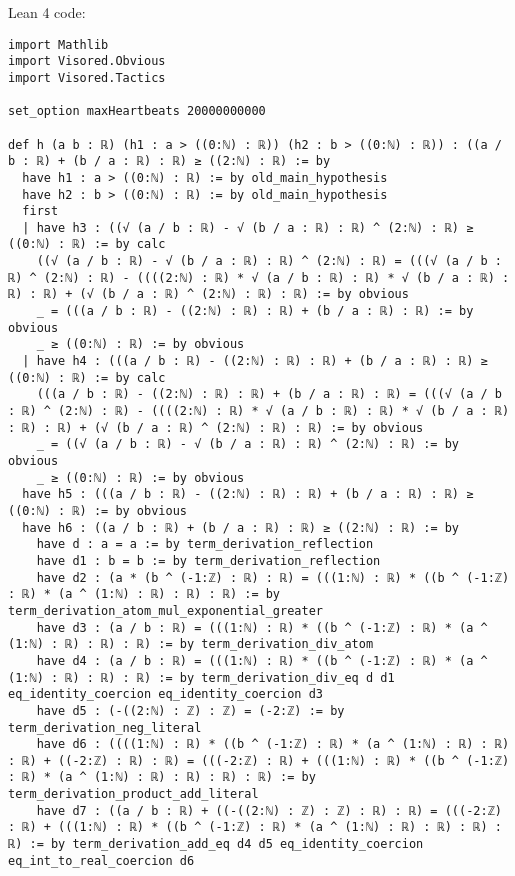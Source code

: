 \documentclass{article}
\begin{document}
Lean 4 code:
\begin{tcolorbox}[colback=white!10, width=\linewidth]
\begin{lstlisting}[language=Lean4]
import Mathlib
import Visored.Obvious
import Visored.Tactics

set_option maxHeartbeats 20000000000

def h (a b : ℝ) (h1 : a > ((0:ℕ) : ℝ)) (h2 : b > ((0:ℕ) : ℝ)) : ((a / b : ℝ) + (b / a : ℝ) : ℝ) ≥ ((2:ℕ) : ℝ) := by
  have h1 : a > ((0:ℕ) : ℝ) := by old_main_hypothesis
  have h2 : b > ((0:ℕ) : ℝ) := by old_main_hypothesis
  first
  | have h3 : ((√ (a / b : ℝ) - √ (b / a : ℝ) : ℝ) ^ (2:ℕ) : ℝ) ≥ ((0:ℕ) : ℝ) := by calc
    ((√ (a / b : ℝ) - √ (b / a : ℝ) : ℝ) ^ (2:ℕ) : ℝ) = (((√ (a / b : ℝ) ^ (2:ℕ) : ℝ) - ((((2:ℕ) : ℝ) * √ (a / b : ℝ) : ℝ) * √ (b / a : ℝ) : ℝ) : ℝ) + (√ (b / a : ℝ) ^ (2:ℕ) : ℝ) : ℝ) := by obvious
    _ = (((a / b : ℝ) - ((2:ℕ) : ℝ) : ℝ) + (b / a : ℝ) : ℝ) := by obvious
    _ ≥ ((0:ℕ) : ℝ) := by obvious
  | have h4 : (((a / b : ℝ) - ((2:ℕ) : ℝ) : ℝ) + (b / a : ℝ) : ℝ) ≥ ((0:ℕ) : ℝ) := by calc
    (((a / b : ℝ) - ((2:ℕ) : ℝ) : ℝ) + (b / a : ℝ) : ℝ) = (((√ (a / b : ℝ) ^ (2:ℕ) : ℝ) - ((((2:ℕ) : ℝ) * √ (a / b : ℝ) : ℝ) * √ (b / a : ℝ) : ℝ) : ℝ) + (√ (b / a : ℝ) ^ (2:ℕ) : ℝ) : ℝ) := by obvious
    _ = ((√ (a / b : ℝ) - √ (b / a : ℝ) : ℝ) ^ (2:ℕ) : ℝ) := by obvious
    _ ≥ ((0:ℕ) : ℝ) := by obvious
  have h5 : (((a / b : ℝ) - ((2:ℕ) : ℝ) : ℝ) + (b / a : ℝ) : ℝ) ≥ ((0:ℕ) : ℝ) := by obvious
  have h6 : ((a / b : ℝ) + (b / a : ℝ) : ℝ) ≥ ((2:ℕ) : ℝ) := by
    have d : a = a := by term_derivation_reflection
    have d1 : b = b := by term_derivation_reflection
    have d2 : (a * (b ^ (-1:ℤ) : ℝ) : ℝ) = (((1:ℕ) : ℝ) * ((b ^ (-1:ℤ) : ℝ) * (a ^ (1:ℕ) : ℝ) : ℝ) : ℝ) := by term_derivation_atom_mul_exponential_greater
    have d3 : (a / b : ℝ) = (((1:ℕ) : ℝ) * ((b ^ (-1:ℤ) : ℝ) * (a ^ (1:ℕ) : ℝ) : ℝ) : ℝ) := by term_derivation_div_atom
    have d4 : (a / b : ℝ) = (((1:ℕ) : ℝ) * ((b ^ (-1:ℤ) : ℝ) * (a ^ (1:ℕ) : ℝ) : ℝ) : ℝ) := by term_derivation_div_eq d d1 eq_identity_coercion eq_identity_coercion d3
    have d5 : (-((2:ℕ) : ℤ) : ℤ) = (-2:ℤ) := by term_derivation_neg_literal
    have d6 : ((((1:ℕ) : ℝ) * ((b ^ (-1:ℤ) : ℝ) * (a ^ (1:ℕ) : ℝ) : ℝ) : ℝ) + ((-2:ℤ) : ℝ) : ℝ) = (((-2:ℤ) : ℝ) + (((1:ℕ) : ℝ) * ((b ^ (-1:ℤ) : ℝ) * (a ^ (1:ℕ) : ℝ) : ℝ) : ℝ) : ℝ) := by term_derivation_product_add_literal
    have d7 : ((a / b : ℝ) + ((-((2:ℕ) : ℤ) : ℤ) : ℝ) : ℝ) = (((-2:ℤ) : ℝ) + (((1:ℕ) : ℝ) * ((b ^ (-1:ℤ) : ℝ) * (a ^ (1:ℕ) : ℝ) : ℝ) : ℝ) : ℝ) := by term_derivation_add_eq d4 d5 eq_identity_coercion eq_int_to_real_coercion d6

\end{lstlisting}
\end{tcolorbox}
\end{document}
